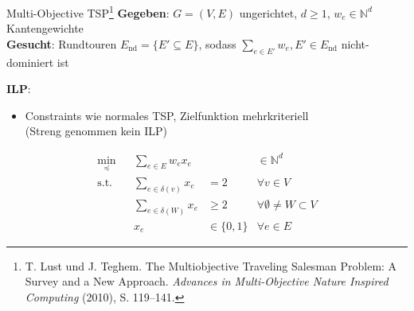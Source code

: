 \documentclass[ngerman,aspectratio=169,10pt]{beamer}
\begin{document}
\begin{frame}{Multi-Objective TSP\footnote{T. Lust und J. Teghem. The Multiobjective Traveling Salesman Problem: A Survey and a New Approach. \emph{Advances in Multi-Objective Nature Inspired Computing} (2010), S. 119–141.}}
	\textbf{Gegeben}: $G=(V,E)$ ungerichtet, $d\geq1$, $w_e\in{\mathbb{N}^d}$ Kantengewichte\\
	\textbf{Gesucht}: Rundtouren $E_\text{nd}=\{E'\subseteq E\}$, sodass $\sum_{e\in E'}w_e,E'\in E_\text{nd}$ nicht-dominiert ist

	\textbf{ILP}:
	\begin{itemize}
		\item Constraints wie normales TSP, Zielfunktion mehrkriteriell\\ (Streng genommen kein ILP)
	\end{itemize}
	\begin{align*}
		{\min}_\preceq && \sum_{e\in E}w_ex_e&&\in\mathbb{N}^d\\
		\text{s.t.} && \sum_{e\in \delta(v)}x_e &=2 &\forall v\in V\\
		&& \sum_{e\in \delta(W)}x_e &\geq2 &\forall \emptyset\neq W\subset V\\
		&& x_e &\in\{0,1\} &\forall e\in E
	\end{align*}
\end{frame}
\end{document}
